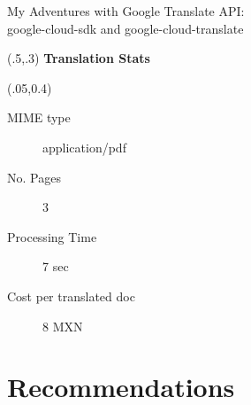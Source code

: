 \documentclass{beamer}
\begin{document}
\begin{frame}{My Adventures with Google Translate API:\\
google-cloud-sdk and google-cloud-translate}

\begin{textblock}{1}(.5,.3)
\textbf{Translation Stats}
\end {textblock}


\begin{textblock}{1}(.05,0.4)
\begin{description}
  \item [MIME type] application/pdf 
  \item [No. Pages] 3
  \item [Processing Time] 7 sec
  \item [Cost per translated doc] 8 MXN
\end{description}

\end {textblock}

\end{frame}


\section{Recommendations}
\end{document}
